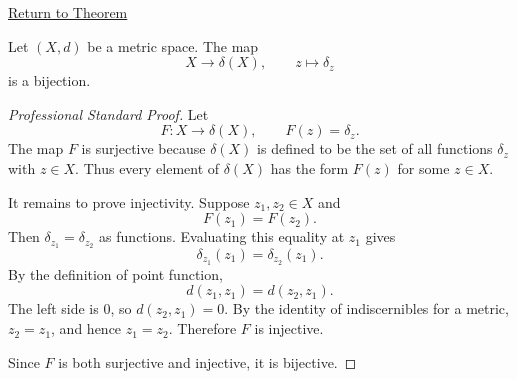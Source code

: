 \newpage
{}
\label{prf:metric-point-functions-identify-points}

\begin{remark*}[Return]
\hyperref[thm:metric-point-functions-identify-points]{Return to Theorem}
\end{remark*}

\begin{theorem*}
Let \((X,d)\) be a metric space.  The map
\[
  X\to\delta(X),
  \qquad
  z\mapsto\delta_z
\]
is a bijection.
\end{theorem*}

\begin{proof}[Professional Standard Proof]
\LRAProofBodyStart
Let
\[
  F:X\to\delta(X),
  \qquad
  F(z)=\delta_z.
\]
The map \(F\) is surjective because \(\delta(X)\) is defined to be the set of
all functions \(\delta_z\) with \(z\in X\).  Thus every element of
\(\delta(X)\) has the form \(F(z)\) for some \(z\in X\).

It remains to prove injectivity.  Suppose \(z_1,z_2\in X\) and
\[
  F(z_1)=F(z_2).
\]
Then \(\delta_{z_1}=\delta_{z_2}\) as functions.  Evaluating this equality at
\(z_1\) gives
\[
  \delta_{z_1}(z_1)=\delta_{z_2}(z_1).
\]
By the definition of point function,
\[
  d(z_1,z_1)=d(z_2,z_1).
\]
The left side is \(0\), so \(d(z_2,z_1)=0\).  By the identity of
indiscernibles for a metric, \(z_2=z_1\), and hence \(z_1=z_2\).  Therefore
\(F\) is injective.

Since \(F\) is both surjective and injective, it is bijective.
\end{proof}

